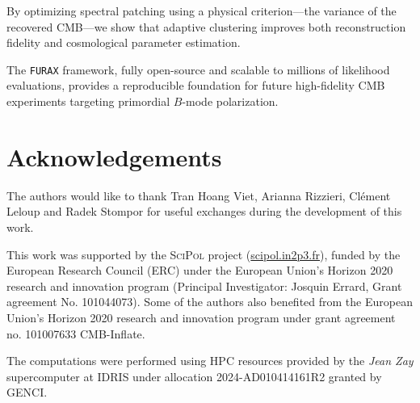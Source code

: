 \documentclass[fleqn,usenatbib]{mnras}
\begin{document}
By optimizing spectral patching using a physical criterion---the variance of the recovered CMB---we show that adaptive clustering improves both reconstruction fidelity and cosmological parameter estimation. 

The \texttt{FURAX} framework, fully open-source and scalable to millions of likelihood evaluations, provides a reproducible foundation for future high-fidelity CMB experiments targeting primordial \( B \)-mode polarization.

\section*{Acknowledgements}


The authors would like to thank Tran Hoang Viet, Arianna Rizzieri, Cl\'ement Leloup and Radek Stompor for useful exchanges during the development of this work. 


This work was supported by the \textsc{SciPol} project (\href{https://scipol.in2p3.fr}{scipol.in2p3.fr}), funded by the European Research Council (ERC) under the European Union’s Horizon 2020 research and innovation program (Principal Investigator: Josquin Errard, Grant agreement No. 101044073). Some of the authors also benefited from the European Union’s Horizon 2020 research and innovation program under grant agreement no. 101007633 CMB-Inflate. 

The computations were performed using HPC resources provided by the \textit{Jean Zay} supercomputer at IDRIS under allocation 2024-AD010414161R2 granted by GENCI. 






\end{document}
